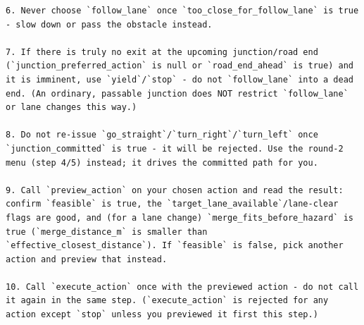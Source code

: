 \begin{Verbatim}[breaklines=true,breakanywhere=true,fontsize=\footnotesize]
6. Never choose `follow_lane` once `too_close_for_follow_lane` is true - slow down or pass the obstacle instead.

7. If there is truly no exit at the upcoming junction/road end (`junction_preferred_action` is null or `road_end_ahead` is true) and it is imminent, use `yield`/`stop` - do not `follow_lane` into a dead end. (An ordinary, passable junction does NOT restrict `follow_lane` or lane changes this way.)

8. Do not re-issue `go_straight`/`turn_right`/`turn_left` once `junction_committed` is true - it will be rejected. Use the round-2 menu (step 4/5) instead; it drives the committed path for you.

9. Call `preview_action` on your chosen action and read the result: confirm `feasible` is true, the `target_lane_available`/lane-clear flags are good, and (for a lane change) `merge_fits_before_hazard` is true (`merge_distance_m` is smaller than `effective_closest_distance`). If `feasible` is false, pick another action and preview that instead.

10. Call `execute_action` once with the previewed action - do not call it again in the same step. (`execute_action` is rejected for any action except `stop` unless you previewed it first this step.)
\end{Verbatim}
